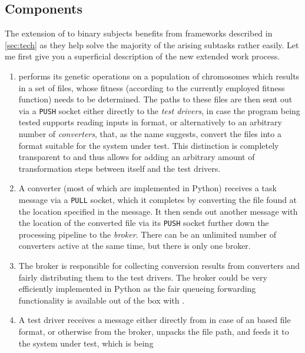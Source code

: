 \subsection{Components}
\label{sec:components}
The extension of \xmlmate to binary subjects benefits from frameworks described in \cref{sec:tech} as they 
help solve the majority of the arising subtasks rather easily. Let me first give you a superficial description
of the new extended \xmlmate work process. 
\begin{enumerate}
  \item \xmlmate performs its genetic operations on a population of chromosomes which results in a set of 
  \xml files, whose fitness (according to the currently employed fitness function) needs to be determined.
  The paths to these files are then sent out via a \zmq \texttt{PUSH} socket either directly to the 
  \emph{test drivers}, in case the program being tested supports reading inputs in \xml format, or alternatively 
  to an arbitrary number of \emph{converters}, that, as the name suggests, convert the \xml files into a format 
  suitable for the system under test. This distinction is completely transparent to \xmlmate and thus allows for 
  adding an arbitrary amount of transformation steps between itself and the test drivers.
  \item A converter (most of which are implemented in {\small Python}) receives a task message via a 
  \zmq \texttt{PULL} socket, which it completes by converting the file found at the location specified in the message. 
  It then sends out another message with the location of the converted file via its \texttt{PUSH} socket further 
  down the processing pipeline to the \emph{broker}.
  There can be an unlimited number of converters active at the same time, but there is only one broker.
  \item The broker is responsible for collecting conversion results from converters and fairly distributing them 
  to the test drivers. The broker could be very efficiently implemented in {\small Python} as the fair 
  queueing forwarding functionality is available out of the box with \zmq.
  \item A test driver receives a message either directly from \xmlmate in case of an \xml based file format, 
  or otherwise from the broker, unpacks the file path, and feeds it to the system under test, which is being 

\end{enumerate}
